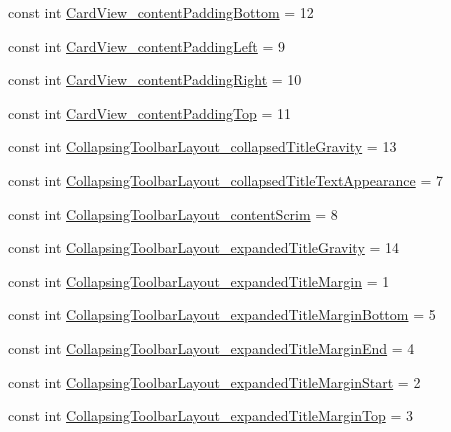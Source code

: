 \begin{CompactItemize}
\item 
const int \hyperlink{class__2doo_1_1_droid_1_1_resource_1_1_styleable_8ef371084bc9ffeac7496fa8752b472e}{CardView\_\-contentPaddingBottom} = 12
\item 
const int \hyperlink{class__2doo_1_1_droid_1_1_resource_1_1_styleable_e46d8516bdd5f9854c097c666bf755f9}{CardView\_\-contentPaddingLeft} = 9
\item 
const int \hyperlink{class__2doo_1_1_droid_1_1_resource_1_1_styleable_ff28814150b777fad622d344b521521b}{CardView\_\-contentPaddingRight} = 10
\item 
const int \hyperlink{class__2doo_1_1_droid_1_1_resource_1_1_styleable_9f7199dba873c08a34261badf92da115}{CardView\_\-contentPaddingTop} = 11
\item 
const int \hyperlink{class__2doo_1_1_droid_1_1_resource_1_1_styleable_5c9df063b8cf7f6254bb0abcb3c94675}{CollapsingToolbarLayout\_\-collapsedTitleGravity} = 13
\item 
const int \hyperlink{class__2doo_1_1_droid_1_1_resource_1_1_styleable_a1193c7f8b7487f82563f515ea16b35b}{CollapsingToolbarLayout\_\-collapsedTitleTextAppearance} = 7
\item 
const int \hyperlink{class__2doo_1_1_droid_1_1_resource_1_1_styleable_d7201835cc0c3737d151536181e7709b}{CollapsingToolbarLayout\_\-contentScrim} = 8
\item 
const int \hyperlink{class__2doo_1_1_droid_1_1_resource_1_1_styleable_2675b0a1ba3fdf8d4cec9117e2062b68}{CollapsingToolbarLayout\_\-expandedTitleGravity} = 14
\item 
const int \hyperlink{class__2doo_1_1_droid_1_1_resource_1_1_styleable_2d6755eeb6a8eac48b09b8f165fb4ff1}{CollapsingToolbarLayout\_\-expandedTitleMargin} = 1
\item 
const int \hyperlink{class__2doo_1_1_droid_1_1_resource_1_1_styleable_ca9b80d4b19f6de0267b8d7f48f8ba7b}{CollapsingToolbarLayout\_\-expandedTitleMarginBottom} = 5
\item 
const int \hyperlink{class__2doo_1_1_droid_1_1_resource_1_1_styleable_95f9ce428160846ed4a0ee26886a5d09}{CollapsingToolbarLayout\_\-expandedTitleMarginEnd} = 4
\item 
const int \hyperlink{class__2doo_1_1_droid_1_1_resource_1_1_styleable_963432f0ddf862c2a63bcf26f70cfdcb}{CollapsingToolbarLayout\_\-expandedTitleMarginStart} = 2
\item 
const int \hyperlink{class__2doo_1_1_droid_1_1_resource_1_1_styleable_d2f6017d2b6e1107b6b444d12d414c99}{CollapsingToolbarLayout\_\-expandedTitleMarginTop} = 3

\end{CompactItemize}
